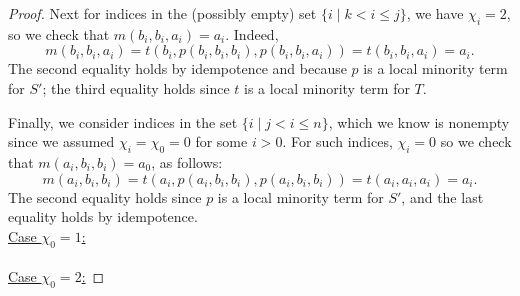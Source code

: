 \begin{proof}
  Next for indices in the (possibly empty) set $\{i \mid k< i \leq j\}$, we have
  $\chi_i = 2$, so we check that $m(b_i, b_i, a_i) = a_i$.  Indeed,
  \[
  m(b_i,b_i,a_i) = t(b_i, p(b_i, b_i, b_i), p(b_i, b_i, a_i)) = t(b_i, b_i, a_i)
  = a_i.
  \]
  The second equality holds by idempotence and because $p$ is a
  local minority term for $S'$; the third equality holds since $t$ is a local minority
  term for $T$.

  Finally, we consider indices in the set $\{i \mid j< i \leq n\}$, which we know is
  nonempty since we assumed $\chi_i = \chi_0 = 0$ for some $i>0$.
  For such indices, $\chi_i=0$ so we check that
  $m(a_i,b_i,b_i)= a_0$, as follows:
  \[
  m(a_i,b_i,b_i) = t(a_i, p(a_i, b_i, b_i), p(a_i, b_i, b_i)) =
   t(a_i, a_i, a_i) =a_i.
  \]
  The second equality holds since $p$ is a local minority term for $S'$,
  and the last equality holds by idempotence.
  \\
  \underline{Case $\chi_0 = 1$:}\\
  \\
  \underline{Case $\chi_0 = 2$:} 
  
  
\end{proof}

\draftsecskip












































\appendix


